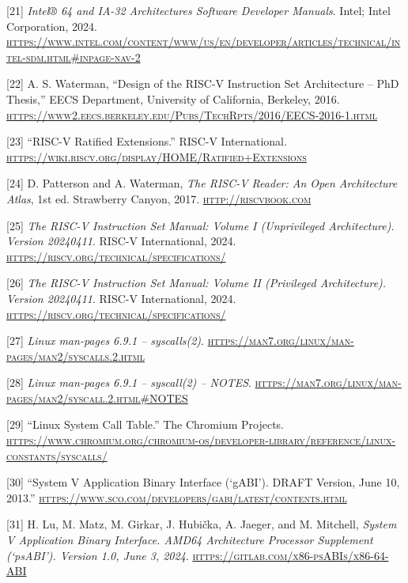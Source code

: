 \documentclass[a4paper,12pt,final]{article}
\begin{document}
\hypertarget{citeproc_bib_item_21}{[21] \textit{Intel® 64 and IA-32 Architectures Software Developer Manuals}. Intel; Intel Corporation, 2024. \textsc{\url{https://www.intel.com/content/www/us/en/developer/articles/technical/intel-sdm.html\#inpage-nav-2}}}

\hypertarget{citeproc_bib_item_22}{[22] A. S. Waterman, “Design of the RISC-V Instruction Set Architecture – PhD Thesis,” EECS Department, University of California, Berkeley, 2016. \textsc{\url{https://www2.eecs.berkeley.edu/Pubs/TechRpts/2016/EECS-2016-1.html}}}

\hypertarget{citeproc_bib_item_23}{[23] “RISC-V Ratified Extensions.” RISC-V International. \textsc{\url{https://wiki.riscv.org/display/HOME/Ratified+Extensions}}}

\hypertarget{citeproc_bib_item_24}{[24] D. Patterson and A. Waterman, \textit{The RISC-V Reader: An Open Architecture Atlas}, 1st ed. Strawberry Canyon, 2017. \textsc{\url{http://riscvbook.com}}}

\hypertarget{citeproc_bib_item_25}{[25] \textit{The RISC-V Instruction Set Manual: Volume I (Unprivileged Architecture). Version 20240411}. RISC-V International, 2024. \textsc{\url{https://riscv.org/technical/specifications/}}}

\hypertarget{citeproc_bib_item_26}{[26] \textit{The RISC-V Instruction Set Manual: Volume II (Privileged Architecture). Version 20240411}. RISC-V International, 2024. \textsc{\url{https://riscv.org/technical/specifications/}}}

\hypertarget{citeproc_bib_item_27}{[27] \textit{Linux man-pages 6.9.1 – syscalls(2)}. \textsc{\url{https://man7.org/linux/man-pages/man2/syscalls.2.html}}}

\hypertarget{citeproc_bib_item_28}{[28] \textit{Linux man-pages 6.9.1 – syscall(2) – NOTES}. \textsc{\url{https://man7.org/linux/man-pages/man2/syscall.2.html\#NOTES}}}

\hypertarget{citeproc_bib_item_29}{[29] “Linux System Call Table.” The Chromium Projects. \textsc{\url{https://www.chromium.org/chromium-os/developer-library/reference/linux-constants/syscalls/}}}

\hypertarget{citeproc_bib_item_30}{[30] “System V Application Binary Interface (`gABI’). DRAFT Version, June 10, 2013.” \textsc{\url{https://www.sco.com/developers/gabi/latest/contents.html}}}

\hypertarget{citeproc_bib_item_31}{[31] H. Lu, M. Matz, M. Girkar, J. Hubička, A. Jaeger, and M. Mitchell, \textit{System V Application Binary Interface. AMD64 Architecture Processor Supplement (`psABI’). Version 1.0, June 3, 2024}. \textsc{\url{https://gitlab.com/x86-psABIs/x86-64-ABI}}}
\end{document}
